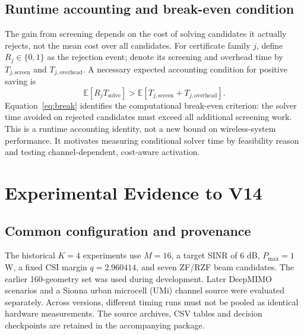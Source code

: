 \documentclass[journal]{IEEEtran}
\begin{document}
\subsection{Runtime accounting and break-even condition}
The gain from screening depends on the cost of solving candidates it actually rejects, not the mean cost over all candidates. For certificate family $j$, define $R_j\in\{0,1\}$ as the rejection event; denote its screening and overhead time by $T_{j,\mathrm{screen}}$ and $T_{j,\mathrm{overhead}}$. A necessary expected accounting condition for positive saving is
\begin{equation}
\mathbb E\left[R_jT_{\mathrm{solve}}\right]
>\mathbb E\left[T_{j,\mathrm{screen}}+T_{j,\mathrm{overhead}}\right].
\label{eq:break}
\end{equation}
Equation~\eqref{eq:break} identifies the computational break-even criterion: the solver time avoided on rejected candidates must exceed all additional screening work. This is a runtime accounting identity, not a new bound on wireless-system performance. It motivates measuring conditional solver time by feasibility reason and testing channel-dependent, cost-aware activation.

\section{Experimental Evidence to V14}
\subsection{Common configuration and provenance}
The historical $K=4$ experiments use $M=16$, a target SINR of 6 dB, $P_{\max}=1$ W, a fixed CSI margin $q=2.960414$, and seven ZF/RZF beam candidates. The earlier 160-geometry set was used during development. Later DeepMIMO scenarios and a Sionna urban microcell (UMi) channel source were evaluated separately. Across versions, different timing runs must not be pooled as identical hardware measurements. The source archives, CSV tables and decision checkpoints are retained in the accompanying package.
\end{document}

